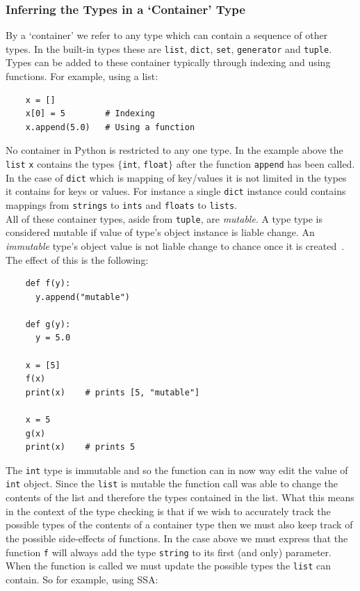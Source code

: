 \documentclass[12pt, titlepage]{article}
\begin{document}
\subsubsection{Inferring the Types in a `Container' Type}
By a `container' we refer to any type which can contain a sequence of other types. In the built-in types these are \texttt{list}, \texttt{dict}, \texttt{set}, \texttt{generator} and \texttt{tuple}. \\
\indent Types can be added to these container typically through indexing and using functions. For example, using a list:
\begin{lstlisting}
    x = []
    x[0] = 5        # Indexing
    x.append(5.0)   # Using a function
\end{lstlisting}
No container in Python is restricted to any one type. In the example above the \texttt{list} \texttt{x} contains the types $\{$\texttt{int}, \texttt{float}$\}$ after the function \texttt{append} has been called. In the case of \texttt{dict} which is mapping of key/values it is not limited in the types it contains for keys or values. For instance a single \texttt{dict} instance could contains mappings from \texttt{strings} to \texttt{ints} and \texttt{floats} to \texttt{lists}. \\
\indent All of these container types, aside from \texttt{tuple}, are \textit{mutable}. A type type is considered mutable if value of type's object instance is liable change. An \textit{immutable} type's object value is not liable change to chance once it is created~\cite{pythonMutable}. The effect of this is the following:
\begin{lstlisting}
    def f(y):
      y.append("mutable")
     
    def g(y):
      y = 5.0
      
    x = [5]
    f(x)
    print(x)    # prints [5, "mutable"]
    
    x = 5
    g(x)
    print(x)    # prints 5
\end{lstlisting}
The \texttt{int} type is immutable and so the function can in now way edit the value of \texttt{int} object. Since the \texttt{list} is mutable the function call was able to change the contents of the list and therefore the types contained in the list. What this means in the context of the type checking is that if we wish to accurately track the possible types of the contents of a container type then we must also keep track of the possible side-effects of functions. In the case above we must express that the function \texttt{f} will always add the type \texttt{string} to its first (and only) parameter. When the function is called we must update the possible types the \texttt{list} can contain. So for example, using SSA:
\end{document}
